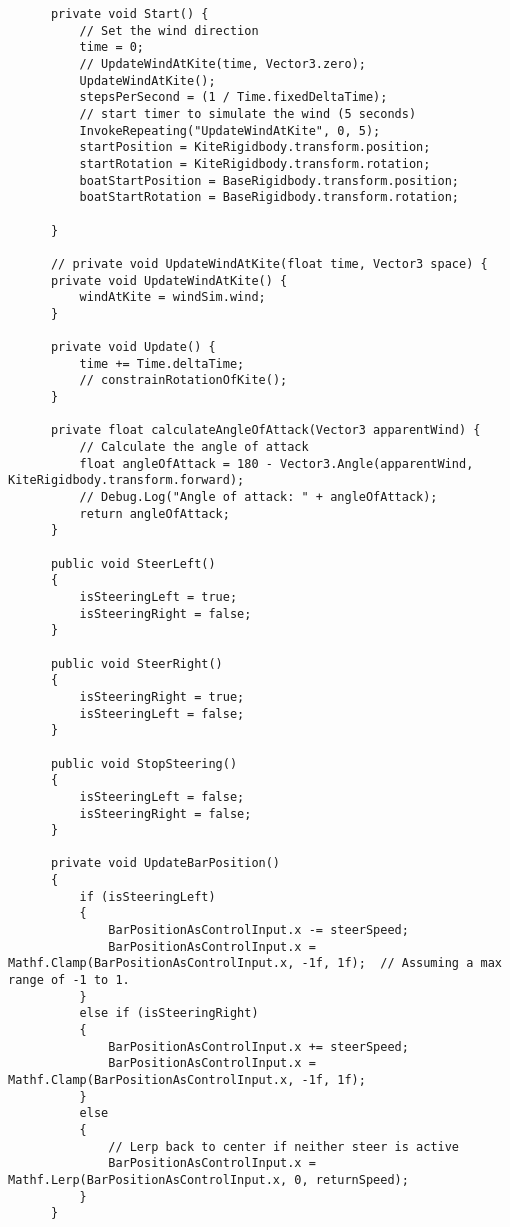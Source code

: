 \begin{lstlisting}
      private void Start() {
          // Set the wind direction
          time = 0;
          // UpdateWindAtKite(time, Vector3.zero);
          UpdateWindAtKite();
          stepsPerSecond = (1 / Time.fixedDeltaTime);
          // start timer to simulate the wind (5 seconds)
          InvokeRepeating("UpdateWindAtKite", 0, 5);
          startPosition = KiteRigidbody.transform.position;
          startRotation = KiteRigidbody.transform.rotation;
          boatStartPosition = BaseRigidbody.transform.position;
          boatStartRotation = BaseRigidbody.transform.rotation;
  
      }
  
      // private void UpdateWindAtKite(float time, Vector3 space) {
      private void UpdateWindAtKite() {
          windAtKite = windSim.wind;
      }
  
      private void Update() {
          time += Time.deltaTime;
          // constrainRotationOfKite();
      }
  
      private float calculateAngleOfAttack(Vector3 apparentWind) {
          // Calculate the angle of attack
          float angleOfAttack = 180 - Vector3.Angle(apparentWind, KiteRigidbody.transform.forward);
          // Debug.Log("Angle of attack: " + angleOfAttack);
          return angleOfAttack;
      }
  
      public void SteerLeft()
      {
          isSteeringLeft = true;
          isSteeringRight = false;
      }
  
      public void SteerRight()
      {
          isSteeringRight = true;
          isSteeringLeft = false;
      }
  
      public void StopSteering()
      {
          isSteeringLeft = false;
          isSteeringRight = false;
      }
  
      private void UpdateBarPosition()
      {
          if (isSteeringLeft)
          {
              BarPositionAsControlInput.x -= steerSpeed;
              BarPositionAsControlInput.x = Mathf.Clamp(BarPositionAsControlInput.x, -1f, 1f);  // Assuming a max range of -1 to 1.
          }
          else if (isSteeringRight)
          {
              BarPositionAsControlInput.x += steerSpeed;
              BarPositionAsControlInput.x = Mathf.Clamp(BarPositionAsControlInput.x, -1f, 1f);
          }
          else
          {
              // Lerp back to center if neither steer is active
              BarPositionAsControlInput.x = Mathf.Lerp(BarPositionAsControlInput.x, 0, returnSpeed);
          }
      }
  

\end{lstlisting}
